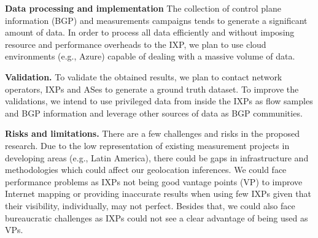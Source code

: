 

	\textbf{Data processing and implementation} The collection of control plane information (BGP) and measurements campaigns tends to generate a significant amount of data. In order to process all data efficiently and without imposing resource and performance overheads to the IXP, we plan to use cloud environments (e.g., Azure) capable of dealing with a massive volume of data.


	\textbf{Validation.} To validate the obtained results, we plan to contact network operators, IXPs and ASes to generate a ground truth dataset. To improve the validations, we intend to use privileged data from inside the IXPs as flow samples and BGP information and leverage other sources of data as BGP communities.

	\textbf{Risks and limitations.} There are a few challenges and risks in the proposed research. Due to the low representation of existing measurement projects in developing areas (e.g., Latin America), there could be gaps in infrastructure and methodologies which could affect our geolocation inferences. We could face performance problems as IXPs not being good vantage points (VP) to improve Internet mapping or providing inaccurate results when using few IXPs given that their visibility, individually, may not perfect. Besides that, we could also face bureaucratic challenges as IXPs could not see a clear advantage of being used as VPs.

